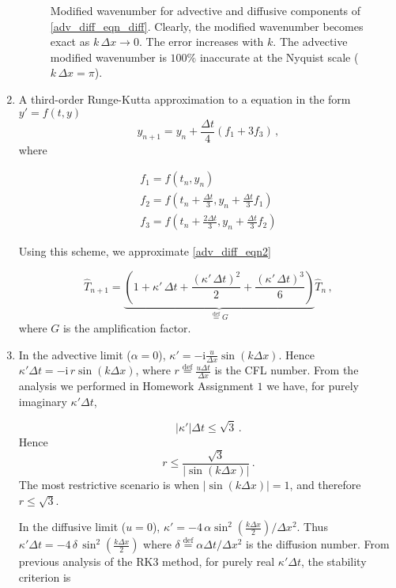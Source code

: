 \documentclass[11pt]{article}
\newcommand{\defn}{\stackrel{\text{def}}{=}}
\newcommand{\ii}{\mathrm{i}}
\def\beq{\begin{equation}}
\def\eeq{\end{equation}}
\begin{document}
\begin{enumerate}[label=(\alph*)]
\begin{figure}[p]
\centerline{}
\caption{Modified wavenumber for advective and diffusive components of \eqref{adv_diff_eqn_diff}. Clearly, the modified wavenumber becomes exact as $k \, \Delta x \to 0$. The error increases with $k$. The advective modified wavenumber is $100  \%$ inaccurate at the Nyquist scale ($k \, \Delta x = \pi$).}
    \label{comp}
\end{figure}

\item A third-order Runge-Kutta approximation to a equation in the form $y' = f(t,y)$
    \beq
        \label{RK3}
        y_{n+1} = y_{n} + \frac{\Delta t}{4} \left( f_1 + 3 f_3 \right) \, ,
    \eeq
    where

    \begin{align}
        f_1 = f\left(t_n,y_n\right) \nonumber \\
        f_2 = f\left(t_n + \tfrac{\Delta t}{3}, y_n + \tfrac{\Delta t}{3} f_1 \right) \nonumber \\
        f_3 = f\left(t_n + \tfrac{2 \Delta t}{3} , y_n + \tfrac{\Delta t}{3} f_2 \right)
    \end{align}

    Using this scheme, we approximate \eqref{adv_diff_eqn2} 

    \beq
        \label{rk3_adv_diff}
        \hat{T}_{n+1} = \underbrace{\left(1 + \kappa' \, \Delta t + \frac{(\kappa' \, \Delta t)^2}{2}+ \frac{(\kappa' \, \Delta t)^3}{6}  \right)}_{\defn G}  \hat{T}_n \, ,
    \eeq
    where $G$ is the amplification factor.

\item In the advective limit ($\alpha = 0$), $\kappa' = -\ii\tfrac{u}{\Delta x}\sin\left( k \Delta x\right)$. Hence $\kappa' \Delta t = -\ii \,r \sin\left( k \Delta x \right)$, where $r \defn \tfrac{u \Delta t}{\Delta x}$ is the CFL number. From the analysis we performed in Homework Assignment $1$ we have, for purely imaginary $\kappa' \Delta t$,

    \beq
    |\kappa'| \Delta t \leq \sqrt{3}\, .
    \eeq
    Hence
    \beq
r \leq \frac{\sqrt{3}}{|\sin\left(k \Delta x\right)|}\,.
    \eeq
    The most restrictive scenario is when  $|\sin\left(k \Delta x\right)| = 1$, and therefore $\boxed{r \leq \sqrt{3}}$.

    In the diffusive limit ($u = 0$), $\kappa' = - 4 \, \alpha \sin^2 \left(\tfrac{k \Delta x}{2} \right)/\Delta x^2$. Thus $\kappa' \Delta t = -4 \, \delta \, \sin^2 \left(\tfrac{k \Delta x}{2} \right)$ where $\delta \defn \alpha \Delta t /\Delta x^2$ is the diffusion number. From previous analysis of the RK3 method, for purely real $\kappa' \Delta t$, the stability criterion is


\end{enumerate}
\end{document}
